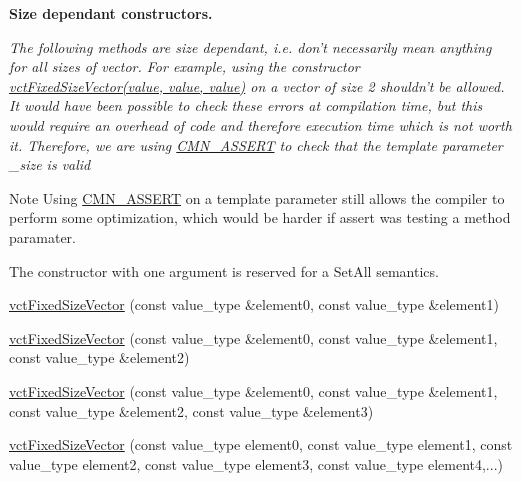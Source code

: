 \begin{Indent}{\bf Size dependant constructors.}\par
{\em The following methods are size dependant, i.\-e. don't necessarily mean anything for all sizes of vector. For example, using the constructor \hyperlink{classvct_fixed_size_vector}{vct\-Fixed\-Size\-Vector(value, value, value)} on a vector of size 2 shouldn't be allowed. It would have been possible to check these errors at compilation time, but this would require an overhead of code and therefore execution time which is not worth it. Therefore, we are using \hyperlink{group__cisst_common_ga6a12b7031ea38ac5bf5937b8633c97ff}{C\-M\-N\-\_\-\-A\-S\-S\-E\-R\-T} to check that the template parameter \-\_\-size is valid

\begin{DoxyNote}{Note}
Using \hyperlink{group__cisst_common_ga6a12b7031ea38ac5bf5937b8633c97ff}{C\-M\-N\-\_\-\-A\-S\-S\-E\-R\-T} on a template parameter still allows the compiler to perform some optimization, which would be harder if assert was testing a method paramater.

The constructor with one argument is reserved for a Set\-All semantics. 
\end{DoxyNote}
}\begin{DoxyCompactItemize}
\item 
\hyperlink{classvct_fixed_size_vector_ac2cbbed5bc559da583f3d46fa59dbb67}{vct\-Fixed\-Size\-Vector} (const value\-\_\-type \&element0, const value\-\_\-type \&element1)
\item 
\hyperlink{classvct_fixed_size_vector_a94255928c63b2be209b0506186c28460}{vct\-Fixed\-Size\-Vector} (const value\-\_\-type \&element0, const value\-\_\-type \&element1, const value\-\_\-type \&element2)
\item 
\hyperlink{classvct_fixed_size_vector_a48b58bbc8ce7ce4cdfc6add64e407048}{vct\-Fixed\-Size\-Vector} (const value\-\_\-type \&element0, const value\-\_\-type \&element1, const value\-\_\-type \&element2, const value\-\_\-type \&element3)
\item 
\hyperlink{classvct_fixed_size_vector_ad2fabc2335b24ceb7aefbeadf5385b3a}{vct\-Fixed\-Size\-Vector} (const value\-\_\-type element0, const value\-\_\-type element1, const value\-\_\-type element2, const value\-\_\-type element3, const value\-\_\-type element4,...)
\end{DoxyCompactItemize}
\end{Indent}
{\bf }\par
